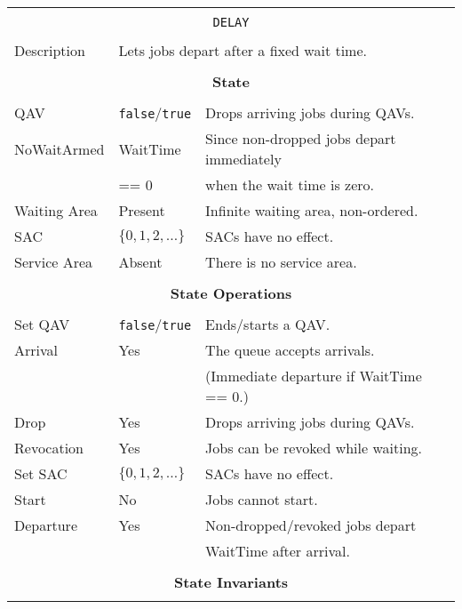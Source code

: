 \documentclass[12pt]{book}
\begin{document}
\begin{tabular}{|l|l|l|}
\hline
\multicolumn{3}{|c|}{} \\
\multicolumn{3}{|c|}{\lstinline[basicstyle=\large]{DELAY}} \\
\multicolumn{3}{|c|}{} \\
\hline
Description & \multicolumn{2}{|l|}{Lets jobs depart after a fixed wait time.} \\
\hline
\multicolumn{3}{|c|}{} \\
\multicolumn{3}{|c|}{\bf State} \\
\multicolumn{3}{|c|}{} \\
\hline
QAV & \lstinline|false|/\lstinline|true| & Drops arriving jobs during QAVs. \\
\hline
NoWaitArmed & WaitTime & Since non-dropped jobs depart immediately \\
            & == 0     & when the wait time is zero. \\
\hline
Waiting Area & Present & Infinite waiting area, non-ordered. \\
\hline
SAC & $\{0, 1, 2, \ldots\}$ & SACs have no effect. \\
\hline
Service Area & Absent & There is no service area. \\
\hline
\multicolumn{3}{|c|}{} \\
\multicolumn{3}{|c|}{\bf State Operations} \\
\multicolumn{3}{|c|}{} \\
\hline
Set QAV & \lstinline|false|/\lstinline|true| & Ends/starts a QAV. \\
\hline
Arrival & Yes & The queue accepts arrivals. \\
        &     & (Immediate departure if WaitTime == 0.) \\
\hline
Drop & Yes & Drops arriving jobs during QAVs. \\
\hline
Revocation & Yes & Jobs can be revoked while waiting. \\
\hline
Set SAC & $\{0, 1, 2, \ldots\}$ & SACs have no effect. \\
\hline
Start & No & Jobs cannot start. \\
\hline
Departure & Yes & Non-dropped/revoked jobs depart \\
          &     & WaitTime after arrival. \\
\hline
\multicolumn{3}{|c|}{} \\
\multicolumn{3}{|c|}{\bf State  Invariants} \\
\multicolumn{3}{|c|}{} \\

\end{tabular}
\end{document}
